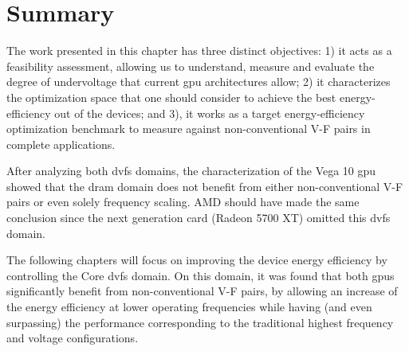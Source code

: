 \section{Summary}

The work presented in this chapter has three distinct objectives: 1) it acts as a feasibility assessment, allowing us to understand, measure and evaluate the degree of undervoltage that current \acrshort{gpu} architectures allow; 2) it characterizes the optimization space that one should consider to achieve the best energy-efficiency out of the devices; and 3), it works as a target energy-efficiency optimization benchmark to measure against non-conventional V-F pairs in complete applications.

After analyzing both \acrshort{dvfs} domains, the characterization of the Vega 10 \acrshort{gpu} showed that the \acrshort{dram} domain does not benefit from either non-conventional V-F pairs or even solely frequency scaling. AMD should have made the same conclusion since the next generation card (Radeon 5700 XT) omitted this \acrshort{dvfs} domain.

The following chapters will focus on improving the device energy efficiency by controlling the Core \acrshort{dvfs} domain. On this domain, it was found that both \acrshort{gpu}s significantly benefit from non-conventional V-F pairs, by allowing an increase of the energy efficiency at lower operating frequencies while having (and even surpassing) the performance corresponding to the traditional highest frequency and voltage configurations.
